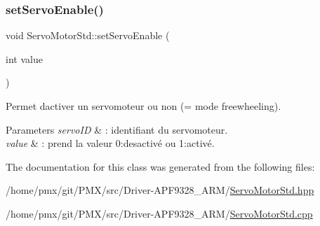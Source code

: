 \subsubsection{\texorpdfstring{set\+Servo\+Enable()}{setServoEnable()}}
{\footnotesize\ttfamily void Servo\+Motor\+Std\+::set\+Servo\+Enable (\begin{DoxyParamCaption}\item[{int}]{value }\end{DoxyParamCaption})}



Permet d\textquotesingle{}activer un servomoteur ou non (= mode freewheeling). 


\begin{DoxyParams}{Parameters}
{\em servo\+ID} & \+: identifiant du servomoteur. \\
\hline
{\em value} & \+: prend la valeur 0\+:desactivé ou 1\+:activé. \\
\hline
\end{DoxyParams}


The documentation for this class was generated from the following files\+:\begin{DoxyCompactItemize}
\item 
/home/pmx/git/\+P\+M\+X/src/\+Driver-\/\+A\+P\+F9328\+\_\+\+A\+R\+M/\hyperlink{ServoMotorStd_8hpp}{Servo\+Motor\+Std.\+hpp}\item 
/home/pmx/git/\+P\+M\+X/src/\+Driver-\/\+A\+P\+F9328\+\_\+\+A\+R\+M/\hyperlink{ServoMotorStd_8cpp}{Servo\+Motor\+Std.\+cpp}\end{DoxyCompactItemize}
